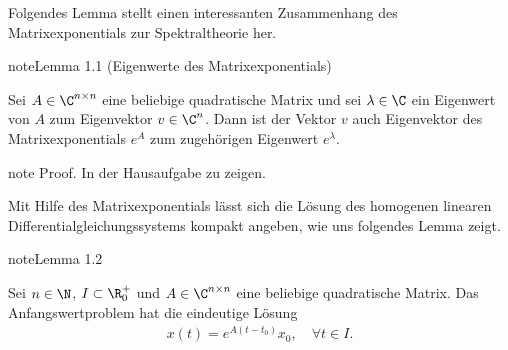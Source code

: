 \documentclass[letterpaper,10pt,english]{jupyterBook}
\begin{document}
\sphinxAtStartPar
Folgendes Lemma stellt einen interessanten Zusammenhang des Matrixexponentials zur Spektraltheorie her.
\label{ode/repetition:lem:mpotew}
\begin{sphinxadmonition}{note}{Lemma 1.1 (Eigenwerte des Matrixexponentials)}



\sphinxAtStartPar
Sei \(A \in \C^{n\times n}\) eine beliebige quadratische Matrix und sei \(\lambda \in \C\) ein Eigenwert von \(A\) zum
Eigenvektor \(v \in \C^n\).
Dann ist der Vektor \(v\) auch Eigenvektor des Matrixexponentials \(e^A\) zum zugehörigen Eigenwert \(e^\lambda\).
\end{sphinxadmonition}

\begin{sphinxadmonition}{note}
\sphinxAtStartPar
Proof. In der Hausaufgabe zu zeigen.
\end{sphinxadmonition}

\sphinxAtStartPar
Mit Hilfe des Matrixexponentials lässt sich die Lösung des homogenen linearen Differentialgleichungssystems {\hyperref[\detokenize{ode/repetition:equation-eq-lin-hom-dglsystem}]{}} kompakt angeben, wie uns folgendes Lemma zeigt.
\label{ode/repetition:lemma-15}
\begin{sphinxadmonition}{note}{Lemma 1.2}



\sphinxAtStartPar
Sei \(n\in \N\), \(I \subset \R^+_0\) und \(A \in \C^{n\times n}\) eine beliebige quadratische Matrix.
Das Anfangswertproblem {\hyperref[\detokenize{ode/repetition:equation-eq-lin-hom-dglsystem}]{}} hat die eindeutige Lösung
\begin{equation*}
\begin{split}x(t) = e^{A(t-t_0)}x_0, \quad \forall t \in I.\end{split}
\end{equation*}\end{sphinxadmonition}
\end{document}
